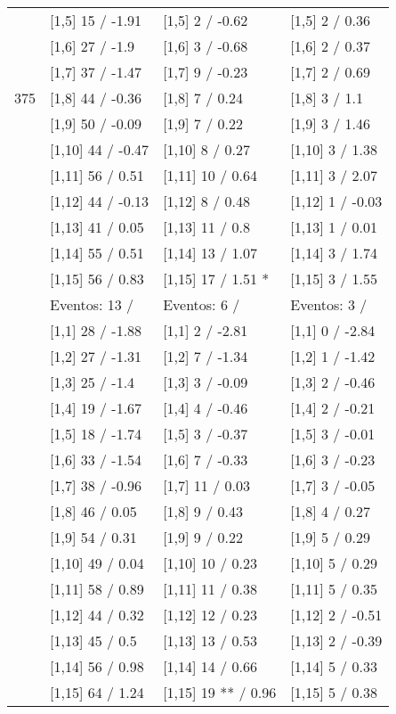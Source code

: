 \begin{table}
\begin{tabular}[t]{llll}
 & {}[1,5] 15  / -1.91 & {}[1,5] 2  / -0.62 & {}[1,5] 2  / 0.36\\
 & {}[1,6] 27  / -1.9 & {}[1,6] 3  / -0.68 & {}[1,6] 2  / 0.37\\
 & {}[1,7] 37  / -1.47 & {}[1,7] 9  / -0.23 & {}[1,7] 2  / 0.69\\
375 & {}[1,8] 44  / -0.36 & {}[1,8] 7  / 0.24 & {}[1,8] 3  / 1.1\\
\addlinespace
 & {}[1,9] 50  / -0.09 & {}[1,9] 7  / 0.22 & {}[1,9] 3  / 1.46\\
 & {}[1,10] 44  / -0.47 & {}[1,10] 8  / 0.27 & {}[1,10] 3  / 1.38\\
 & {}[1,11] 56  / 0.51 & {}[1,11] 10  / 0.64 & {}[1,11] 3  / 2.07\\
 & {}[1,12] 44  / -0.13 & {}[1,12] 8  / 0.48 & {}[1,12] 1  / -0.03\\
 & {}[1,13] 41  / 0.05 & {}[1,13] 11  / 0.8 & {}[1,13] 1  / 0.01\\
\addlinespace
 & {}[1,14] 55  / 0.51 & {}[1,14] 13  / 1.07 & {}[1,14] 3  / 1.74\\
 & {}[1,15] 56  / 0.83 & {}[1,15] 17  / 1.51 * & {}[1,15] 3  / 1.55\\
 & Eventos:  13 / & Eventos:  6 / & Eventos:  3 /\\
 & {}[1,1] 28  / -1.88 & {}[1,1] 2  / -2.81 & {}[1,1] 0  / -2.84\\
 & {}[1,2] 27  / -1.31 & {}[1,2] 7  / -1.34 & {}[1,2] 1  / -1.42\\
\addlinespace
 & {}[1,3] 25  / -1.4 & {}[1,3] 3  / -0.09 & {}[1,3] 2  / -0.46\\
 & {}[1,4] 19  / -1.67 & {}[1,4] 4  / -0.46 & {}[1,4] 2  / -0.21\\
 & {}[1,5] 18  / -1.74 & {}[1,5] 3  / -0.37 & {}[1,5] 3  / -0.01\\
 & {}[1,6] 33  / -1.54 & {}[1,6] 7  / -0.33 & {}[1,6] 3  / -0.23\\
 & {}[1,7] 38  / -0.96 & {}[1,7] 11  / 0.03 & {}[1,7] 3  / -0.05\\
\addlinespace
500 & {}[1,8] 46  / 0.05 & {}[1,8] 9  / 0.43 & {}[1,8] 4  / 0.27\\
 & {}[1,9] 54  / 0.31 & {}[1,9] 9  / 0.22 & {}[1,9] 5  / 0.29\\
 & {}[1,10] 49  / 0.04 & {}[1,10] 10  / 0.23 & {}[1,10] 5  / 0.29\\
 & {}[1,11] 58  / 0.89 & {}[1,11] 11  / 0.38 & {}[1,11] 5  / 0.35\\
 & {}[1,12] 44  / 0.32 & {}[1,12] 12  / 0.23 & {}[1,12] 2  / -0.51\\
\addlinespace
 & {}[1,13] 45  / 0.5 & {}[1,13] 13  / 0.53 & {}[1,13] 2  / -0.39\\
 & {}[1,14] 56  / 0.98 & {}[1,14] 14  / 0.66 & {}[1,14] 5  / 0.33\\
 & {}[1,15] 64  / 1.24 & {}[1,15] 19 ** / 0.96 & {}[1,15] 5  / 0.38\\
\bottomrule
\end{tabular}
\end{table}
